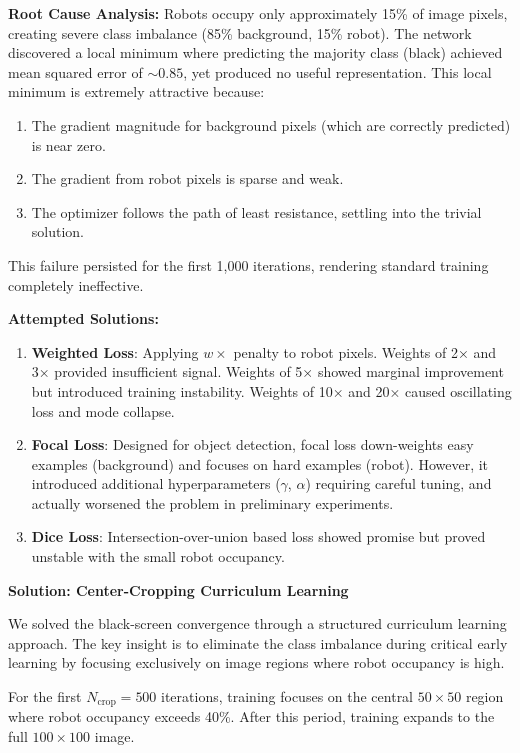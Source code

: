 \documentclass[12pt,a4paper,oneside]{report}
\begin{document}
\textbf{Root Cause Analysis:} Robots occupy only approximately 15\% of image pixels, creating severe class imbalance (85\% background, 15\% robot). The network discovered a local minimum where predicting the majority class (black) achieved mean squared error of $\sim 0.85$, yet produced no useful representation. This local minimum is extremely attractive because:

\begin{enumerate}
    \item The gradient magnitude for background pixels (which are correctly predicted) is near zero.
    \item The gradient from robot pixels is sparse and weak.
    \item The optimizer follows the path of least resistance, settling into the trivial solution.
\end{enumerate}

This failure persisted for the first 1,000 iterations, rendering standard training completely ineffective.

\textbf{Attempted Solutions:}

\begin{enumerate}
    \item \textbf{Weighted Loss}: Applying $w \times$ penalty to robot pixels. Weights of 2× and 3× provided insufficient signal. Weights of 5× showed marginal improvement but introduced training instability. Weights of 10× and 20× caused oscillating loss and mode collapse.
    \item \textbf{Focal Loss}: Designed for object detection, focal loss down-weights easy examples (background) and focuses on hard examples (robot). However, it introduced additional hyperparameters ($\gamma$, $\alpha$) requiring careful tuning, and actually worsened the problem in preliminary experiments.
    \item \textbf{Dice Loss}: Intersection-over-union based loss showed promise but proved unstable with the small robot occupancy.
\end{enumerate}

\textbf{Solution: Center-Cropping Curriculum Learning}

We solved the black-screen convergence through a structured curriculum learning approach. The key insight is to eliminate the class imbalance during critical early learning by focusing exclusively on image regions where robot occupancy is high.

For the first $N_{\text{crop}} = 500$ iterations, training focuses on the central $50 \times 50$ region where robot occupancy exceeds 40\%. After this period, training expands to the full $100 \times 100$ image.
\end{document}

